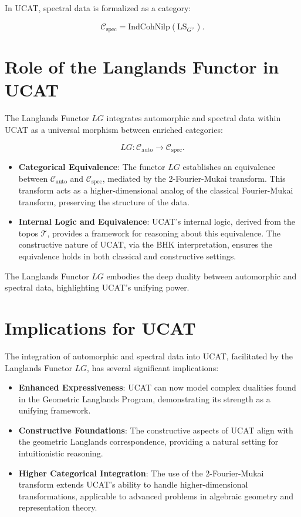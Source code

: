 \documentclass{article}
\begin{document}
In UCAT, spectral data is formalized as a category:

\[
\mathcal{C}_{\text{spec}} = \text{IndCohNilp}(\text{LS}_{G^{\vee}}).
\]

\section{Role of the Langlands Functor in UCAT}

The Langlands Functor \( LG \) integrates automorphic and spectral data within UCAT as a universal morphism between enriched categories:

\[
LG : \mathcal{C}_{\text{auto}} \longrightarrow \mathcal{C}_{\text{spec}}.
\]

\begin{itemize}
    \item \textbf{Categorical Equivalence}: The functor \( LG \) establishes an equivalence between \( \mathcal{C}_{\text{auto}} \) and \( \mathcal{C}_{\text{spec}} \), mediated by the 2-Fourier-Mukai transform. This transform acts as a higher-dimensional analog of the classical Fourier-Mukai transform, preserving the structure of the data.
    \item \textbf{Internal Logic and Equivalence}: UCAT’s internal logic, derived from the topos \( \mathcal{T} \), provides a framework for reasoning about this equivalence. The constructive nature of UCAT, via the BHK interpretation, ensures the equivalence holds in both classical and constructive settings.
\end{itemize}

The Langlands Functor \( LG \) embodies the deep duality between automorphic and spectral data, highlighting UCAT’s unifying power.

\section{Implications for UCAT}

The integration of automorphic and spectral data into UCAT, facilitated by the Langlands Functor \( LG \), has several significant implications:

\begin{itemize}
    \item \textbf{Enhanced Expressiveness}: UCAT can now model complex dualities found in the Geometric Langlands Program, demonstrating its strength as a unifying framework.
    \item \textbf{Constructive Foundations}: The constructive aspects of UCAT align with the geometric Langlands correspondence, providing a natural setting for intuitionistic reasoning.
    \item \textbf{Higher Categorical Integration}: The use of the 2-Fourier-Mukai transform extends UCAT’s ability to handle higher-dimensional transformations, applicable to advanced problems in algebraic geometry and representation theory.
\end{itemize}
\end{document}
